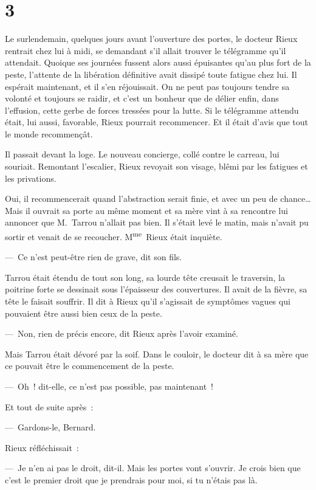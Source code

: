 \documentclass[french,twoside]{book} %
\begin{document}
\section[{3}]{3}
\noindent Le surlendemain, quelques jours avant l’ouverture des portes, le docteur Rieux rentrait chez lui à midi, se demandant s’il allait trouver le télégramme qu’il attendait. Quoique ses journées fussent alors aussi épuisantes qu’au plus fort de la peste, l’attente de la libération définitive avait dissipé toute fatigue chez lui. Il espérait maintenant, et il s’en réjouissait. On ne peut pas toujours tendre sa volonté et toujours se raidir, et c’est un bonheur que de délier enfin, dans l’effusion, cette gerbe de forces tressées pour la lutte. Si le télégramme attendu était, lui aussi, favorable, Rieux pourrait recommencer. Et il était d’avis que tout le monde recommençât.\par
Il passait devant la loge. Le nouveau concierge, collé contre le carreau, lui souriait. Remontant l’escalier, Rieux revoyait son visage, blêmi par les fatigues et les privations.\par
Oui, il recommencerait quand l’abstraction serait finie, et avec un peu de chance… Mais il ouvrait sa porte au même moment et sa mère vint à sa rencontre lui annoncer que M. Tarrou n’allait pas bien. Il s’était levé le matin, mais n’avait pu sortir et venait de se recoucher. M\textsuperscript{me} Rieux était inquiète.\par
— Ce n’est peut-être rien de grave, dit son fils.\par
Tarrou était étendu de tout son long, sa lourde tête creusait le traversin, la poitrine forte se dessinait sous l’épaisseur des couvertures. Il avait de la fièvre, sa tête le faisait souffrir. Il dit à Rieux qu’il s’agissait de symptômes vagues qui pouvaient être aussi bien ceux de la peste.\par
— Non, rien de précis encore, dit Rieux après l’avoir examiné.\par
Mais Tarrou était dévoré par la soif. Dans le couloir, le docteur dit à sa mère que ce pouvait être le commencement de la peste.\par
— Oh ! dit-elle, ce n’est pas possible, pas maintenant !\par
Et tout de suite après :\par
— Gardons-le, Bernard.\par
Rieux réfléchissait :\par
— Je n’en ai pas le droit, dit-il. Mais les portes vont s’ouvrir. Je crois bien que c’est le premier droit que je prendrais pour moi, si tu n’étais pas là.\par
\end{document}
